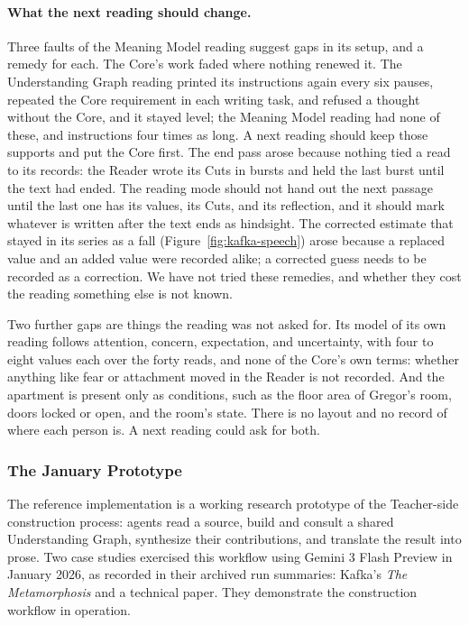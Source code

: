 \documentclass[11pt]{article}
\begin{document}
\paragraph{What the next reading should change.}
Three faults of the Meaning Model reading suggest gaps in its setup, and a
remedy for each. The Core's work faded where nothing renewed it. The
Understanding Graph reading printed its instructions again every six pauses,
repeated the Core requirement in each writing task, and refused a thought
without the Core, and it stayed level; the Meaning Model reading had none of
these, and instructions four times as long. A next reading should keep those
supports and put the Core first. The end pass arose because nothing tied a read
to its records: the Reader wrote its Cuts in bursts and held the last burst
until the text had ended. The reading mode should not hand out the next passage
until the last one has its values, its Cuts, and its reflection, and it should
mark whatever is written after the text ends as hindsight. The corrected
estimate that stayed in its series as a fall (Figure~\ref{fig:kafka-speech})
arose because a replaced value and an added value were recorded alike; a
corrected guess needs to be recorded as a correction. We have not tried these
remedies, and whether they cost the reading something else is not known.

Two further gaps are things the reading was not asked for. Its model of its
own reading follows attention, concern, expectation, and uncertainty, with four
to eight values each over the forty reads, and none of the Core's own terms:
whether anything like fear or attachment moved in the Reader is not recorded.
And the apartment is present only as conditions, such as the floor area of
Gregor's room, doors locked or open, and the room's state. There is no layout
and no record of where each person is. A next reading could ask for both.

\FloatBarrier

\subsubsection{The January Prototype}\label{sec:january-prototype}

The reference implementation is a working research prototype of the
Teacher-side construction process: agents read a source, build and consult a
shared Understanding Graph, synthesize their contributions, and translate the
result into prose. Two case studies exercised this workflow using Gemini 3
Flash Preview in January 2026, as recorded in their archived run summaries:
Kafka's \emph{The Metamorphosis} and a technical paper. They demonstrate the
construction workflow in operation.
\end{document}
